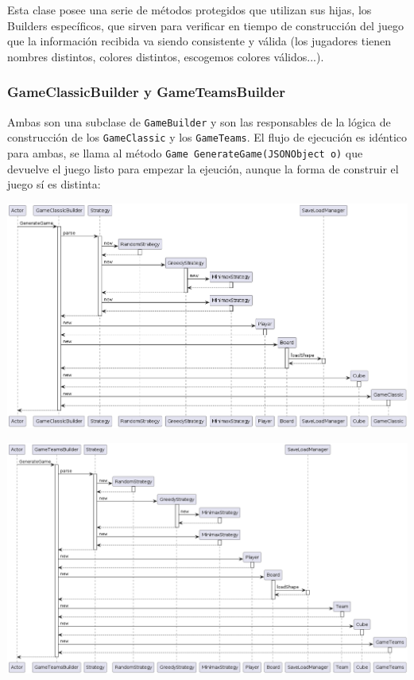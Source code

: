 \documentclass[../DocumentoOficial.tex]{subfiles}
\begin{document}
Esta clase posee una serie de métodos protegidos que utilizan sus hijas, los Builders específicos, que sirven para verificar en tiempo de construcción del juego que la información recibida va siendo consistente y válida (los jugadores tienen nombres distintos, colores distintos, escogemos colores válidos...).

\subsubsection{GameClassicBuilder y GameTeamsBuilder}
Ambas son una subclase de \texttt{GameBuilder} y son las responsables de la lógica de construcción de los \texttt{GameClassic} y los \texttt{GameTeams}. El flujo de ejecución es idéntico para ambas, se llama al método \texttt{Game GenerateGame(JSONObject o)} que devuelve el juego listo para empezar la ejeución, aunque la forma de construir el juego sí es distinta:

\newpage

\begin{center}
\includegraphics[scale=0.45, angle=90]{GameClassicBuilder_final_seq}
\end{center}
\begin{center}
\includegraphics[scale=0.45, angle=90]{GameTeamsBuilder_final_seq}
\end{center}
\end{document}
